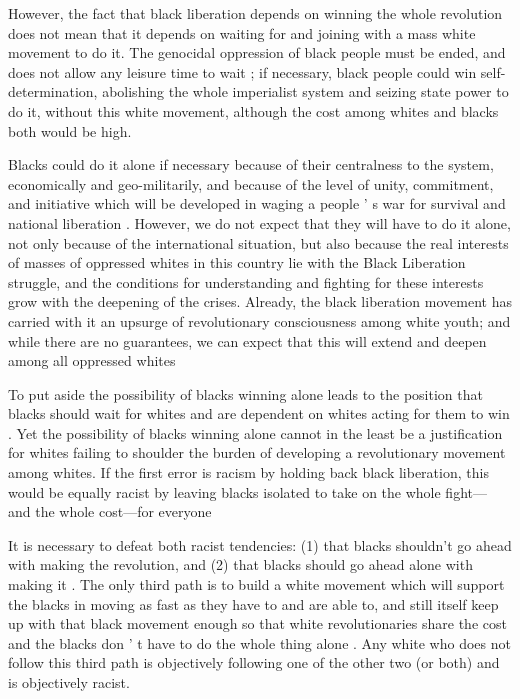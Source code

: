 \documentclass[12pt, titlepage]{article}
\begin{document}
{\begin{spacing}{1.10}
However, the fact that black liberation depends on winning the whole revolution does not mean that it depends on waiting for and joining with a mass white movement to do it. The genocidal oppression of black people must be ended, and does not allow any leisure time to wait ; if necessary, black people could win self-determination, abolishing the whole imperialist system and seizing state power to do it, without this white movement, although the cost among whites and blacks both would be high.

Blacks could do it alone if necessary because of their centralness to the system, economically and geo-militarily, and because of the level of unity, commitment, and initiative which will be developed in waging a people ' s war for survival and national liberation . However, we do not expect that they will have to do it alone, not only because of the international situation, but also because the real interests of masses of oppressed whites in this country lie with the Black Liberation struggle, and the conditions for understanding and fighting for these interests grow with the deepening of the crises. Already, the black liberation movement has carried with it an upsurge of revolutionary consciousness among white youth; and while there are no guarantees, we can expect that this will extend and deepen among all oppressed whites

To put aside the possibility of blacks winning alone leads to the position that blacks should wait for whites and are dependent on whites acting for them to win . Yet the possibility of blacks winning alone cannot in the least be a justification for whites failing to shoulder the burden of developing a revolutionary movement among whites. If the first error is racism by holding back black liberation, this would be equally racist by leaving blacks isolated to take on the whole fight— and the whole cost—for everyone

It is necessary to defeat both racist tendencies: (1) that blacks shouldn't go ahead with making the revolution, and (2) that blacks should go ahead alone with making it . The only third path is to build a white movement which will support the blacks in moving as fast as they have to and are able to, and still itself keep up with that black movement enough so that white revolutionaries share the cost and the blacks don ' t have to do the whole thing alone . Any white who does not follow this third path is objectively following one of the other two (or both) and is objectively racist.


\end{spacing}}
\end{document}

